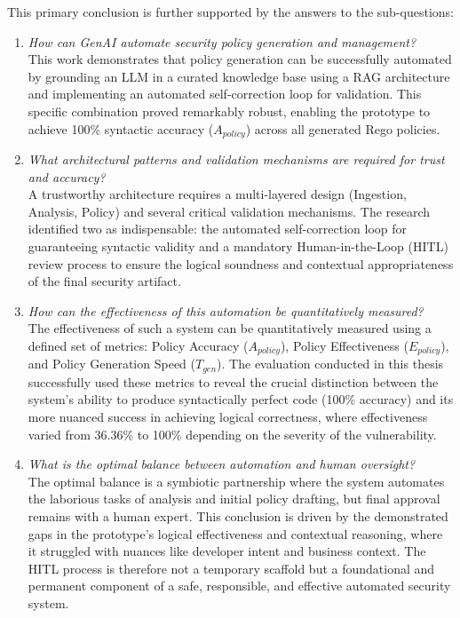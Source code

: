 This primary conclusion is further supported by the answers to the sub-questions:

\begin{enumerate}
    \item \textit{How can GenAI automate security policy generation and management?} \\
    This work demonstrates that policy generation can be successfully automated by grounding an LLM in a curated knowledge base using a RAG architecture and implementing an automated self-correction loop for validation. This specific combination proved remarkably robust, enabling the prototype to achieve 100\% syntactic accuracy (\(A_{policy}\)) across all generated Rego policies.

    \item \textit{What architectural patterns and validation mechanisms are required for trust and accuracy?} \\
    A trustworthy architecture requires a multi-layered design (Ingestion, Analysis, Policy) and several critical validation mechanisms. The research identified two as indispensable: the automated self-correction loop for guaranteeing syntactic validity and a mandatory Human-in-the-Loop (HITL) review process to ensure the logical soundness and contextual appropriateness of the final security artifact.

    \item \textit{How can the effectiveness of this automation be quantitatively measured?} \\
    The effectiveness of such a system can be quantitatively measured using a defined set of metrics: Policy Accuracy (\(A_{policy}\)), Policy Effectiveness (\(E_{policy}\)), and Policy Generation Speed (\(T_{gen}\)). The evaluation conducted in this thesis successfully used these metrics to reveal the crucial distinction between the system's ability to produce syntactically perfect code (100\% accuracy) and its more nuanced success in achieving logical correctness, where effectiveness varied from 36.36\% to 100\% depending on the severity of the vulnerability.

    \item \textit{What is the optimal balance between automation and human oversight?} \\
    The optimal balance is a symbiotic partnership where the system automates the laborious tasks of analysis and initial policy drafting, but final approval remains with a human expert. This conclusion is driven by the demonstrated gaps in the prototype's logical effectiveness and contextual reasoning, where it struggled with nuances like developer intent and business context. The HITL process is therefore not a temporary scaffold but a foundational and permanent component of a safe, responsible, and effective automated security system.
\end{enumerate}

